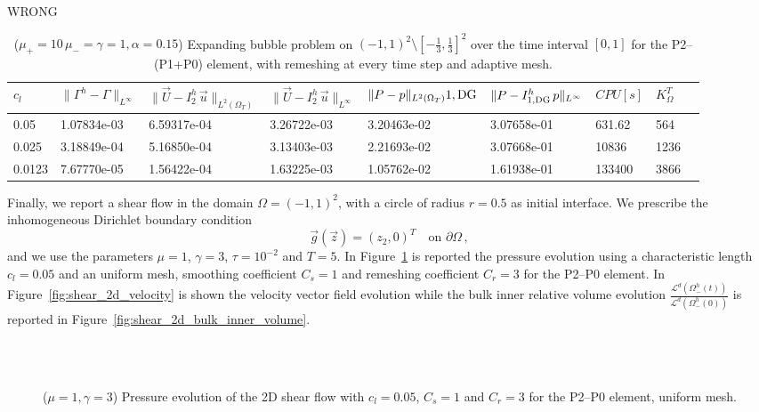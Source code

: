 \documentclass[a4paper,12pt,onecolumn]{article}
\newcommand{\errorXx}{\|\Gamma^h - \Gamma\|_{L^\infty}}
\newcommand{\LerrorUu}[1]{\|\vec U - I^h_{#1}\,\vec u\|_{L^2(\Omega_T)}}
\newcommand{\errorUu}[1]{\|\vec U - I^h_{#1}\,\vec u\|_{L^\infty}}
\newcommand{\errorPp}[1]{\|P - I^h_{#1}\,p\|_{L^\infty}}
\newcommand{\LerrorPp}{\|P - p\|_{L^2(\Omega_T)}}
\begin{document}
\begin{table}
 \center
 WRONG
\begin{tabular}{llHlHllll}
\hline
$c_l$ & $\errorXx$ & $\LerrorUu2$ & $\errorUu2$ & $\LerrorPp{1,\rm{DG}}$ & $\errorPp{1,\rm{DG}}$ & $CPU[s]$ & $K_\Omega^T$\\
 & 1.07834e-03 & 6.59317e-04 & 3.26722e-03 & 3.20463e-02 & 3.07658e-01 & 631.62 & 564\\
0.025 & 3.18849e-04 & 5.16850e-04 & 3.13403e-03 & 2.21693e-02 & 3.07668e-01 & 10836 & 1236\\
0.0123 & 7.67770e-05 & 1.56422e-04 & 1.63225e-03 & 1.05762e-02 & 1.61938e-01 & 133400 & 3866\\
\hline
\end{tabular}
\caption{($\mu_+ = 10\,\mu_- = \gamma = 1,\alpha = 0.15$) Expanding bubble problem on $(-1,1)^2\setminus[-\frac{1}{3},\frac{1}{3}]^2$ over the time interval $[0,1]$ for the P2--(P1+P0) element, with remeshing at every time step and adaptive mesh.}
\label{tab:expandingbubble2Dp2p1p0adaptive}
\end{table}

Finally, we report a shear flow in the domain $\Omega=(-1,1)^2$, with a circle of radius $r=0.5$ as initial interface. We prescribe the inhomogeneous Dirichlet boundary condition
\begin{equation*}
\vec g(\vec z)=(z_2,0)^T\quad \mbox{on }\partial\Omega\,,
\end{equation*}
and we use the parameters $\mu=1$, $\gamma=3$, $\tau=10^{-2}$ and $T=5$. In Figure~\ref{fig:shear_2d} is reported the pressure evolution using a characteristic length $c_l=0.05$ and an uniform mesh, smoothing coefficient $C_s=1$ and remeshing coefficient $C_r=3$ for the P2--P0 element. In Figure~\ref{fig:shear_2d_velocity} is shown the velocity vector field evolution while the bulk inner relative volume evolution $\frac{\mathcal{L}^d(\Omega^h_-(t))}{\mathcal{L}^d(\Omega^h_-(0))}$ is reported in Figure~\ref{fig:shear_2d_bulk_inner_volume}.
\begin{figure}[htbp]
  \centering
  \quad
  \\
  \quad
  \\
  \caption{($\mu=1,\gamma=3$) Pressure evolution of the 2D shear flow with $c_l=0.05$, $C_s=1$ and $C_r=3$ for the P2--P0 element, uniform mesh.}
  \label{fig:shear_2d}
\end{figure}
\end{document}
